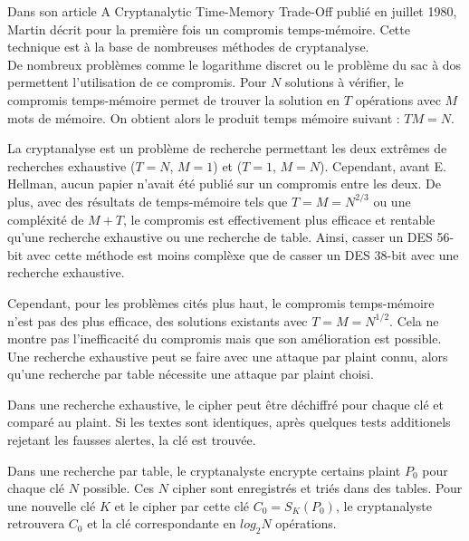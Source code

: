 
	Dans son article \og{}A Cryptanalytic Time-Memory Trade-Off\fg{}\cite{ehellman} publié en juillet 1980, Martin  décrit pour la première fois un compromis temps-mémoire. Cette technique est à la base de nombreuses méthodes de cryptanalyse.\\

	De nombreux problèmes comme le logarithme discret ou le problème du sac à dos permettent l'utilisation de ce compromis. Pour $N$ solutions à vérifier, le compromis temps-mémoire permet de trouver la solution en $T$ opérations avec $M$ mots de mémoire. On obtient alors le produit temps mémoire suivant : $TM = N$.

	La cryptanalyse est un problème de recherche permettant les deux extrêmes de recherches exhaustive ($T=N$, $M=1$) et ($T=1$, $M=N$). Cependant, avant E. Hellman\cite{ehellman}, aucun papier n'avait été publié sur un compromis entre les deux. De plus, avec des résultats de temps-mémoire tels que $T = M = N^{2/3}$ ou une compléxité de $M + T$, le compromis est effectivement plus efficace et rentable qu'une recherche exhaustive ou une recherche de table. Ainsi, casser un DES 56-bit avec cette méthode est moins complèxe que de casser un DES 38-bit avec une recherche exhaustive.

	Cependant, pour les problèmes cités plus haut, le compromis temps-mémoire n'est pas des plus efficace, des solutions existants avec $T = M = N^{1/2}$. Cela ne montre pas l'inefficacité du compromis mais que son amélioration est possible.\\

	Une recherche exhaustive peut se faire avec une attaque par \gls{plaint} connu, alors qu'une recherche par table nécessite une attaque par \gls{plaint} choisi.

	Dans une recherche exhaustive, le \gls{cipher} peut être déchiffré pour chaque clé et comparé au \gls{plaint}. Si les textes sont identiques, après quelques tests additionels rejetant les fausses alertes, la clé est trouvée.

	Dans une recherche par table, le cryptanalyste encrypte certains \gls{plaint} $P_0$ pour chaque clé $N$ possible. Ces $N$ \gls{cipher} sont enregistrés et triés dans des tables. Pour une nouvelle clé $K$ et le \gls{cipher} par cette clé $C_0 = S_K(P_0)$, le cryptanalyste retrouvera $C_0$ et la clé correspondante en $log_2 N$ opérations.\\

